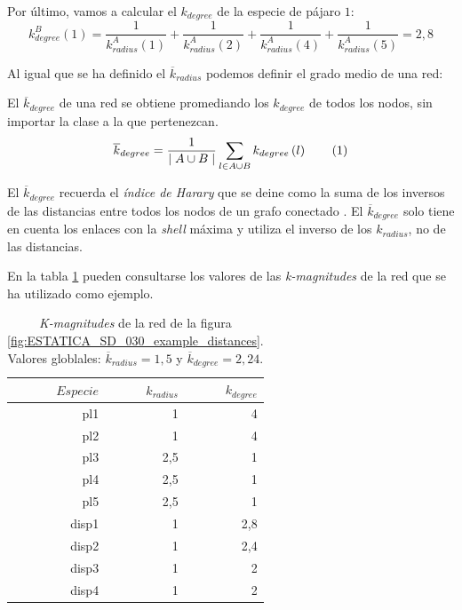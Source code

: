 Por último, vamos a calcular el $k_{degree}$ de la especie de pájaro $1$:
\begin{equation}
k^B_{degree}\left(1\right) = \frac{1}{k^A_{radius}\left(1\right)} + \frac{1}{k^A_{radius}\left(2\right)} + \frac{1}{k^A_{radius}\left(4\right)} + \frac{1}{k^A_{radius}\left(5\right)} = 2,8
\label{example_kdegree}
\end{equation}

Al igual que se ha definido el $\overline k_{radius}$ podemos definir el grado medio de una red:
\begin{theo} 
El \textit{$\overline k_{degree}$} de una red se obtiene promediando los ${k}_{degree}$ de todos los nodos, sin importar la clase a la que pertenezcan.
\begin{align*}
\displaystyle
\overline {k}_{degree} = \frac{1}{\mid A \cup B \mid}\sum\limits_{l \in A \cup B} k_{degree}\left(l\right)
\stepcounter{equation}\tag{\theequation}\label{avgkdegree}
\end{align*}
\label{ESTATICA_avgkdegree}
\end{theo}

El  $\overline k_{degree}$ recuerda el \textit{índice de Harary} que se deine como la suma de los inversos de las distancias entre todos los nodos de un grafo conectado \cite{plavvsic1993harary}. El  $\overline k_{degree}$ solo tiene en cuenta los enlaces con la \textit{shell} máxima y utiliza el inverso de los $k_{radius}$, no de las distancias.

En la tabla \ref{table:table_SD_030} pueden consultarse los valores de las \textit{k-magnitudes} de la red que se ha utilizado como ejemplo.

\begin{table}[htbp]
\small
  \centering
    \begin{tabular}{rrr}
    \toprule
    $Especie$ & $k_{radius}$ & $k_{degree}$  \\
    \midrule
    pl1  & 1    & 4 \\
    pl2  & 1    & 4 \\
    pl3  & 2,5  & 1 \\
    pl4  & 2,5  & 1 \\
    pl5  & 2,5  & 1 \\
    disp1 & 1    & 2,8 \\
    disp2 & 1    & 2,4 \\
    disp3 & 1    & 2 \\
    disp4 & 1    & 2 \\
    \bottomrule
    \end{tabular}%
  \caption{\label{table:table_SD_030} \textit{K-magnitudes} de la red de la figura \ref{fig:ESTATICA_SD_030_example_distances}. Valores globlales: $\overline k_{radius} = 1,5 $ y $\overline k_{degree} = 2,24$.}
\end{table}%

